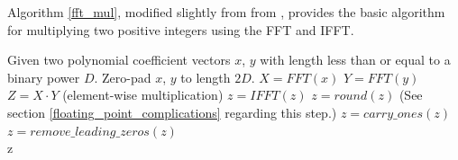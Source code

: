\documentclass[psamsfonts,reqno]{amsart}
\theoremstyle{definition}
\theoremstyle{remark}
\numberwithin{equation}{section}
\begin{document}
Algorithm \ref{fft_mul}, modified slightly from from \cite{crandall2005prime}, provides the basic algorithm for multiplying two positive integers using the FFT and IFFT. 

\begin{algorithm}
	\caption{Basic FFT Multiplication}
	\label{fft_mul}
	\begin{algorithmic}
		\Ensure Given two polynomial coefficient vectors $x$, $y$ with length less than or equal to a binary power $D$.
		\State Zero-pad $x$, $y$ to length $2D$.
		\State $X = FFT(x)$
		\State $Y = FFT(y)$
		\State $Z = X \cdot Y$ (element-wise multiplication)
		\State $z = IFFT(z)$
		\State $z = round(z)$ (See section \ref{floating_point_complications} regarding this step.)
		\State $z = carry\_ones(z)$
		\State $z = remove\_leading\_zeros(z)$ \\
		\Return z
	\end{algorithmic}
\end{algorithm}
\end{document}
